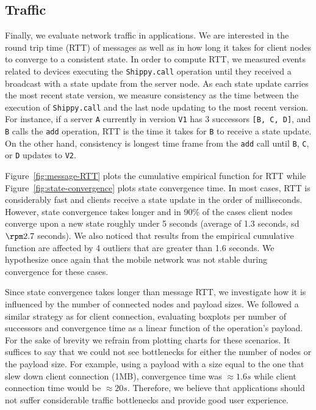 \subsection{Traffic}
\label{sub:eval:traffic}

Finally, we evaluate network traffic in \APIshort applications.
We are interested in the round trip time (RTT) of messages as well as in how long it takes for client nodes to converge to a consistent state.
In order to compute RTT, we measured events related to devices executing the \texttt{Shippy.call} operation until they received a broadcast with a state update from the server node.
As each state update carries the most recent state version, we measure consistency as the time between the execution of \texttt{Shippy.call} and the last node updating to the most recent version.
For instance, if a server \texttt{A} currently in version \texttt{V1} has 3 successors \texttt{[B, C, D]}, and \texttt{B} calls the \texttt{add} operation, RTT is the time it takes for \texttt{B} to receive a state update.
On the other hand, consistency is longest time frame from the \texttt{add} call until \texttt{B}, \texttt{C}, or \texttt{D} updates to \texttt{V2}.


Figure~\ref{fig:message-RTT} plots the cumulative empirical function for RTT while Figure~\ref{fig:state-convergence} plots state convergence time.
In most cases, RTT is considerably fast and clients receive a state update in the order of milliseconds.
However, state convergence takes longer and in 90\% of the cases client nodes converge upon a new state roughly under 5 seconds (average of 1.3 seconds, sd $\rpm 2.7$ seconds).
We also noticed that results from the empirical cumulative function are affected by 4 outliers that are greater than 1.6 seconds. We hypothesize once again that the mobile network was not stable during convergence for these cases. 


Since state convergence takes longer than message RTT, we investigate how it is influenced by the number of connected nodes and payload sizes.
We followed a similar strategy as for client connection, evaluating boxplots per number of successors and convergence time as a linear function of the operation's payload.
For the sake of brevity we refrain from plotting charts for these scenarios.
It suffices to say that we could not see bottlenecks for either the number of nodes or the payload size. 
For example, using a payload with a size equal to the one that slew down client connection (1MB), convergence time was $\approx 1.6s$ while client connection time would be $\approx 20s$.
Therefore, we believe that \APIshort applications should not suffer considerable traffic bottlenecks and provide good user experience. 

